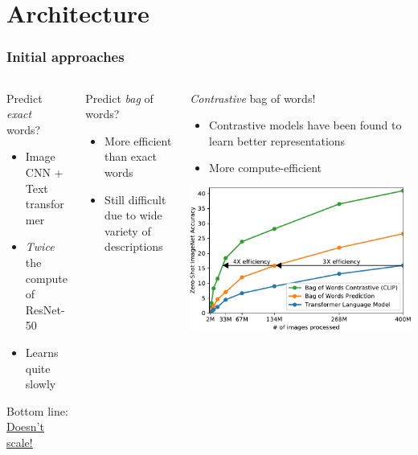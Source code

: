 \section{Architecture}
\begin{frame}
    \frametitle{Initial approaches}
    \begin{columns}[t]
        \begin{column}{.3\textwidth}
            Predict \emph{exact} words?
            \begin{itemize}
                \item Image CNN + Text transformer
                \item \emph{Twice} the compute of ResNet-50
                \item Learns quite slowly
            \end{itemize}
            \pause
            Bottom line: \underline{Doesn't scale!}
        \end{column}
        \pause
        \begin{column}{.25\textwidth}
            Predict \emph{bag} of words?
            \begin{itemize}
                \item More efficient than exact words
                \item Still difficult due to wide variety of descriptions
            \end{itemize}
        \end{column}
        \pause
        \begin{column}{.45\textwidth}
            \emph{Contrastive} bag of words!
            \begin{itemize}
                \item Contrastive models have been found to learn better representations
                \item More compute-efficient
            \end{itemize}
            \pause

            \includegraphics[width=\textwidth]{./images/efficiency-ablation}
        \end{column}
    \end{columns}
\end{frame}

